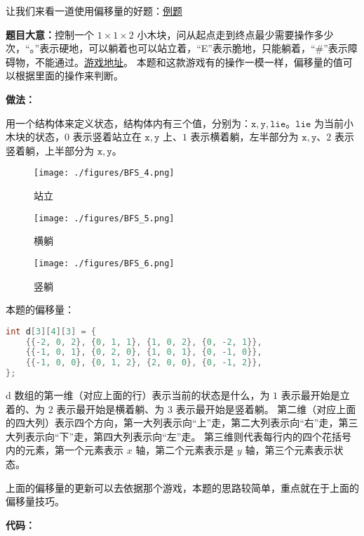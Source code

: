 让我们来看一道使用偏移量的好题：\href{http://poj.org/problem?id=3322}{例题}

\textbf{题目大意：}控制一个 $1 \times 1 \times 2$ 小木块，问从起点走到终点最少需要操作多少次，“。”表示硬地，可以躺着也可以站立着，“E”表示脆地，只能躺着，“\#”表示障碍物，不能通过。\href{https://www.4399.com/flash/6860_3.htm}{游戏地址}。
本题和这款游戏有的操作一模一样，偏移量的值可以根据里面的操作来判断。

\textbf{做法：}

用一个结构体来定义状态，结构体内有三个值，分别为：$\mathtt{x, y, lie}$。$\mathtt{lie}$ 为当前小木块的状态，$0$ 表示竖着站立在 $\mathtt{x, y}$ 上、$1$ 表示横着躺，左半部分为 $\mathtt{x, y}$、$2$ 表示竖着躺，上半部分为 $\mathtt{x, y}$。

\begin{figure}[ht]
\centering
\texttt{[image: ./figures/BFS\_4.png]}
\caption{站立} \label{BFS_fig4}
\end{figure}
\begin{figure}[ht]
\centering
\texttt{[image: ./figures/BFS\_5.png]}
\caption{横躺} \label{BFS_fig5}
\end{figure}
\begin{figure}[ht]
\centering
\texttt{[image: ./figures/BFS\_6.png]}
\caption{竖躺} \label{BFS_fig6}
\end{figure}


本题的偏移量：
\begin{lstlisting}[language=cpp]
int d[3][4][3] = {
    {{-2, 0, 2}, {0, 1, 1}, {1, 0, 2}, {0, -2, 1}},  
    {{-1, 0, 1}, {0, 2, 0}, {1, 0, 1}, {0, -1, 0}},  
    {{-1, 0, 0}, {0, 1, 2}, {2, 0, 0}, {0, -1, 2}},  
};
\end{lstlisting}

d 数组的第一维（对应上面的行）表示当前的状态是什么，为 $1$ 表示最开始是立着的、为 $2$ 表示最开始是横着躺、为 $3$ 表示最开始是竖着躺。
第二维（对应上面的四大列）表示四个方向，第一大列表示向“上”走，第二大列表示向“右”走，第三大列表示向“下”走，第四大列表示向“左”走。
第三维则代表每行内的四个花括号内的元素，第一个元素表示 $x$ 轴，第二个元素表示是 $y$ 轴，第三个元素表示状态。

上面的偏移量的更新可以去依据那个游戏，本题的思路较简单，重点就在于上面的偏移量技巧。


\textbf{代码：}

